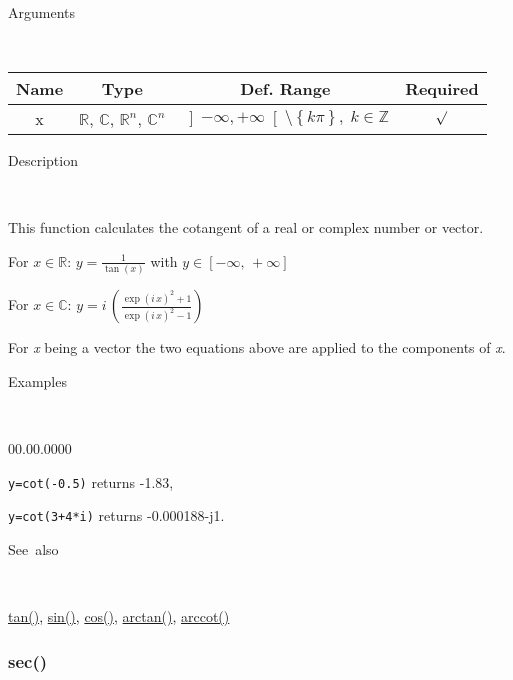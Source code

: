 \begin{description}
\item [Arguments]~
\end{description}
\begin{tabular}{|c|c|c|c|}
\hline 
Name&
Type&
Def. Range&
Required\tabularnewline
\hline
\hline 
x&
$\mathbb{R}$, $\mathbb{C}$, $\mathbb{R}^{n}$, $\mathbb{C}^{n}$&
$\left]-\infty,+\infty\right[\setminus\left\{ k\pi\right\} ,\; k\in\mathbb{Z}$&
$\surd$\tabularnewline
\hline
\end{tabular}

\begin{description}
\item [Description]~
\end{description}
This function calculates the cotangent of a real or complex number
or vector.

\medskip{}
For $x\in\mathbb{R}$: $y={\displaystyle \frac{1}{\tan\left(x\right)}}$
with $y\in\left[-\infty,\,+\infty\right]$

\medskip{}
For $x\in\mathbb{C}$: $y=i\,{\displaystyle \left(\frac{\exp\left(i\, x\right)^{2}+1}{\exp\left(i\, x\right)^{2}-1}\right)}$
\medskip{}

For \textit{x} being a vector the two equations above are
applied to the components of \textit{x}.

\begin{description}
\item [Examples]~
\end{description}
\begin{lyxlist}{00.00.0000}
\item [\texttt{y=cot(-0.5)}]returns -1.83,
\item [\texttt{y=cot(3+4{*}i)}]returns -0.000188-j1.
\end{lyxlist}
\begin{description}
\item [See~also]~
\end{description}
\textcolor{blue}{\hyperlink{tan}{tan()}}\textcolor{black}{,} \textcolor{blue}{\hyperlink{sin}{sin()}}\textcolor{black}{,}
\textcolor{blue}{\hyperlink{cos}{cos()}}\textcolor{black}{,} \textcolor{blue}{\hyperlink{arctan}{arctan()}}\textcolor{black}{,}
\textcolor{blue}{\hyperlink{arccot}{arccot()}}


\newpage
\subsubsection*{\hypertarget{sec}{}{\Large sec()}}



